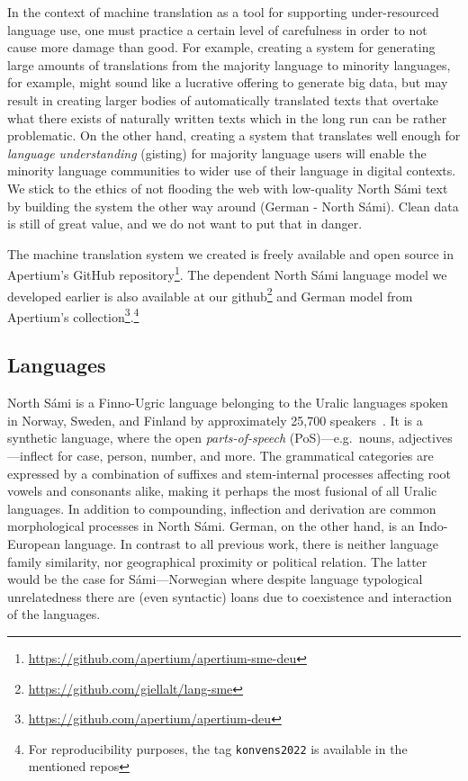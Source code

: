 \documentclass{flammie}
\begin{document}
In the context of machine translation as a tool for supporting under-resourced
language use, one must practice a certain level of carefulness in order to not
cause more damage than good.  For example, creating a system for generating
large amounts of translations from the majority language to minority languages,
for example, might sound like a lucrative offering to generate big data, but may
result in creating larger bodies of automatically translated texts that overtake
what there exists of naturally written texts which in the long run can be rather
problematic.  On the other hand, creating a system that translates well enough
for \textit{language understanding} (gisting) for majority language users will
enable the minority language communities to wider use of their language in
digital contexts.  We stick to the ethics of not flooding the web with
low-quality North Sámi text by building the system the other way around (German
- North Sámi). Clean data is still of great value, and we do not want to put
that in danger.

The machine translation system we created is freely available and open source in
Apertium's GitHub
repository\footnote{\url{https://github.com/apertium/apertium-sme-deu}}. The
dependent North Sámi language model we developed earlier is also available at
our github\footnote{\url{https://github.com/giellalt/lang-sme}} and German model
from Apertium's
collection\footnote{\url{https://github.com/apertium/apertium-deu}}.\footnote{For
reproducibility purposes, the tag \texttt{konvens2022} is available in the
mentioned repos}

\subsection{Languages}

North Sámi is a Finno-Ugric language belonging to the Uralic languages spoken in
Norway, Sweden, and Finland by approximately 25,700
speakers~\cite{Ethnologue2022}. It is a synthetic language, where the open
\textit{parts-of-speech} (PoS)---e.g.\ nouns, adjectives---inflect for case,
person, number, and more. The grammatical categories are expressed by a
combination of suffixes and stem-internal processes affecting root vowels and
consonants alike, making it perhaps the most fusional of all Uralic languages.
In addition to compounding, inflection and derivation are common morphological
processes in North Sámi.  German, on the other hand, is an Indo-European
language.  In contrast to all previous work, there is neither language family
similarity, nor geographical proximity or political relation. The latter would
be the case for Sámi---Norwegian where despite language typological
unrelatedness there are (even syntactic) loans due to coexistence and
interaction of the languages.
\end{document}
